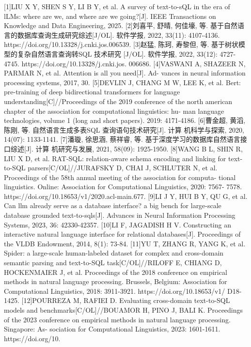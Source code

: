 \documentclass[12pt,a4paper,openright,UTF8]{ctexbook}
\begin{document}
[1]LIU X Y, SHEN S Y, LI B Y, et al. A survey of text-to-sQL in the era of lLMs:
where are we, and where are we going?[J]. IEEE Transactions on Knowledge and
Data Engineering, 2025.
[2]刘喜平, 舒晴, 何佳壕, 等. 基于自然语言的数据库查询生成研究综述[J/OL].
软件学报, 2022, 33(11): 4107-4136. https://doi.org/10.13328/j.cnki.jos.006539.
[3]赵猛, 陈珂, 寿黎但, 等. 基于树状模型的复杂自然语言查询转SQL 技术研究
[J/OL]. 软件学报, 2022, 33(12): 4727-4745. https://doi.org/10.13328/j.cnki.jos.
006686.
[4]VASWANI A, SHAZEER N, PARMAR N, et al. Attention is all you need[J]. Ad-
vances in neural information processing systems, 2017, 30.
[5]DEVLIN J, CHANG M W, LEE K, et al. Bert: pre-training of deep bidirectional
transformers for language understanding[C]//Proceedings of the 2019 conference
of the north american chapter of the association for computational linguistics: hu-
man language technologies, volume 1 (long and short papers). 2019: 4171-4186.
[6]曹金超, 黄滔, 陈刚, 等. 自然语言生成多表SQL 查询语句技术研究[J]. 计算
机科学与探索, 2020, 14(07): 1133-1141.
[7]潘璇, 徐思涵, 蔡祥睿, 等. 基于深度学习的数据库自然语言接口综述[J]. 计算
机研究与发展, 2021, 58(09): 1925-1950.
[8]WANG B L, SHIN R, LIU X D, et al. RAT-SQL: relation-aware schema encoding
and linking for text-to-SQL parsers[C/OL]//JURAFSKY D, CHAI J, SCHLUTER
N, et al. Proceedings of the 58th annual meeting of the association for computa-
tional linguistics. Online: Association for Computational Linguistics, 2020: 7567-
7578. https://doi.org/10.18653/v1/2020.acl-main.677.
[9]LI J Y, HUI B Y, QU G, et al. Can llm already serve as a database interface? a
big bench for large-scale database grounded text-to-sqls[J]. Advances in Neural
Information Processing Systems, 2023, 36: 42330-42357.
[10]LI F, JAGADISH H V. Constructing an interactive natural language interface for
relational databases[J]. Proceedings of the VLDB Endowment, 2014, 8(1): 73-84.
[11]YU T, ZHANG R, YANG K, et al. Spider: a large-scale human-labeled dataset for
complex and cross-domain semantic parsing and text-to-SQL task[C/OL]//RILOFF
E, CHIANG D, HOCKENMAIER J, et al. Proceedings of the 2018 conference on
empirical methods in natural language processing. Brussels, Belgium: Association
for Computational Linguistics, 2018: 3911-3921. https://doi.org/10.18653/v1/
D18-1425.
[12]POURREZA M, RAFIEI D. Evaluating cross-domain text-to-SQL models and
benchmarks[C/OL]//BOUAMOR H, PINO J, BALI K. Proceedings of the 2023
conference on empirical methods in natural language processing. Singapore: As-
sociation for Computational Linguistics, 2023: 1601-1611. https://doi.org/10.
\end{document}
